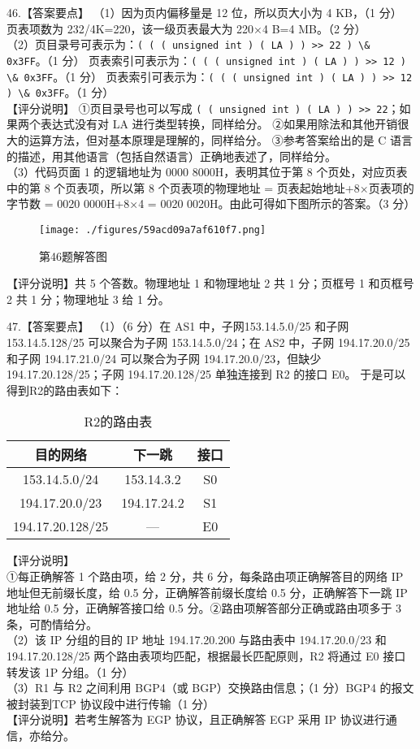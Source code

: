 46.【答案要点】
（1）因为页内偏移量是 12 位，所以页大小为 4 KB，（1 分） 页表项数为 232/4K=220，该一级页表最大为 220×4 B=4 MB。（2 分）  \\
（2）页目录号可表示为：\verb`( ( ( unsigned int ) ( LA ) ) >> 22 ) \& 0x3FF`。（1 分）        页表索引可表示为：\verb`( ( ( unsigned int ) ( LA ) ) >> 12 ) \& 0x3FF`。（1 分）        页表索引可表示为：\verb`( ( ( unsigned int ) ( LA ) ) >> 12 ) \& 0x3FF`。（1 分） \\
【评分说明】 
①页目录号也可以写成 \verb`( ( unsigned int ) ( LA ) ) >> 22`；如果两个表达式没有对 LA 进行类型转换，同样给分。 
②如果用除法和其他开销很大的运算方法，但对基本原理是理解的，同样给分。 
③参考答案给出的是 C 语言的描述，用其他语言（包括自然语言）正确地表述了，同样给分。  \\
（3）代码页面 1 的逻辑地址为 0000 8000H，表明其位于第 8 个页处，对应页表中的第 8 个页表项，所以第 8 个页表项的物理地址 = 页表起始地址+8×页表项的字节数 = 0020 
0000H+8×4 = 0020 0020H。由此可得如下图所示的答案。（3 分）
\begin{figure}[ht]
\centering
\texttt{[image: ./figures/59acd09a7af610f7.png]}
\caption{第46题解答图} \label{fig_CSN13_14}
\end{figure}
【评分说明】共 5 个答数。物理地址 1 和物理地址 2 共 1 分；页框号 1 和页框号 2 共 1 分；物理地址 3 给 1 分。

47.【答案要点】 
  （1）（6 分）在 AS1 中，子网153.14.5.0/25 和子网 153.14.5.128/25 可以聚合为子网
153.14.5.0/24；在 AS2 中，子网 194.17.20.0/25 和子网 194.17.21.0/24 可以聚合为子网 194.17.20.0/23，但缺少 194.17.20.128/25；子网 194.17.20.128/25 单独连接到 R2 的接口 E0。 
于是可以得到R2的路由表如下：
\begin{table}[ht]
\centering
\caption{R2的路由表}\label{tab_CSN13_9}
\begin{tabular}{|c|c|c|}
\hline
目的网络 & 下一跳 & 接口  \\
\hline
153.14.5.0/24 & 153.14.3.2 & S0  \\
\hline
194.17.20.0/23 & 194.17.24.2 & S1  \\
\hline
194.17.20.128/25 & — & E0  \\
\hline
\end{tabular}
\end{table}
【评分说明】 \\
①每正确解答 1 个路由项，给 2 分，共 6 分，每条路由项正确解答目的网络 IP 地址但无前缀长度，给 0.5 分，正确解答前缀长度给 0.5 分，正确解答下一跳 IP 地址给 0.5 分，正确解答接口给 0.5 分。②路由项解答部分正确或路由项多于 3 条，可酌情给分。 \\
（2）该 IP 分组的目的 IP 地址 194.17.20.200 与路由表中 194.17.20.0/23 和 194.17.20.128/25 两个路由表项均匹配，根据最长匹配原则，R2 将通过 E0 接口转发该 1P 分组。（1 分） \\
（3）R1 与 R2 之间利用 BGP4（或 BGP）交换路由信息；（1 分）BGP4 的报文被封装到TCP 协议段中进行传输（1 分） \\
【评分说明】若考生解答为 EGP 协议，且正确解答 EGP 采用 IP 协议进行通信，亦给分。 

